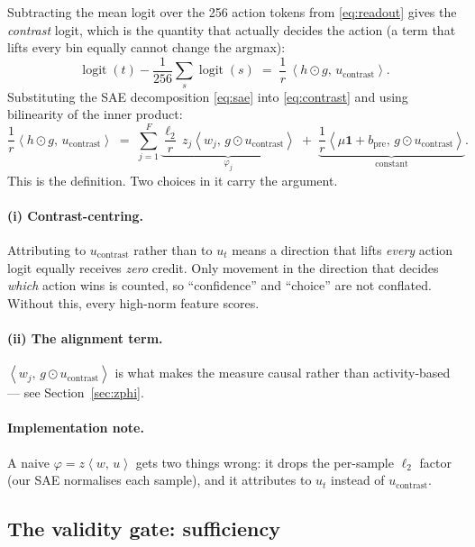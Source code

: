 \documentclass[11pt]{article}
\newcommand{\ip}[2]{\left\langle #1,\, #2 \right\rangle}
\newcommand{\ucon}{u_{\mathrm{contrast}}}
\newcommand{\bpre}{b_{\mathrm{pre}}}
\begin{document}
Subtracting the mean logit over the 256 action tokens from \eqref{eq:readout} gives the
\emph{contrast} logit, which is the quantity that actually decides the action (a term that
lifts every bin equally cannot change the argmax):
\begin{equation}
\operatorname{logit}(t) - \frac{1}{256}\sum_{s}\operatorname{logit}(s)
\;=\; \frac{1}{r}\,\ip{h\odot g}{\ucon}.
\label{eq:contrast}
\end{equation}
Substituting the SAE decomposition \eqref{eq:sae} into \eqref{eq:contrast} and using
bilinearity of the inner product:
\begin{equation}
\frac{1}{r}\ip{h\odot g}{\ucon}
\;=\;
\sum_{j=1}^{F}\underbrace{\frac{\ell_2}{r}\, z_j \ip{w_j}{g\odot\ucon}}_{\textstyle \varphi_j}
\;+\;
\underbrace{\frac{1}{r}\ip{\mu\mathbf{1}+\bpre}{g\odot\ucon}}_{\textstyle \text{constant}} .
\label{eq:decomp}
\end{equation}
This is the definition. Two choices in it carry the argument.

\paragraph{(i) Contrast-centring.} Attributing to $\ucon$ rather than to $u_t$ means a
direction that lifts \emph{every} action logit equally receives \emph{zero} credit. Only
movement in the direction that decides \emph{which} action wins is counted, so ``confidence''
and ``choice'' are not conflated. Without this, every high-norm feature scores.

\paragraph{(ii) The alignment term.} $\ip{w_j}{g\odot\ucon}$ is what makes the measure causal
rather than activity-based --- see Section~\ref{sec:zphi}.

\paragraph{Implementation note.} A naive $\varphi = z\ip{w}{u}$ gets two things wrong: it drops
the per-sample $\ell_2$ factor (our SAE normalises each sample), and it attributes to $u_t$
instead of $\ucon$.

\subsection{The validity gate: sufficiency}
\end{document}
